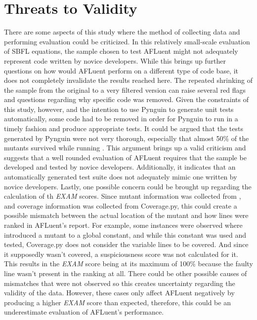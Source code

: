 \section{Threats to Validity}

There are some aspects of this study where the method of collecting data and
performing evaluation could be criticized. In this relatively small-scale
evaluation of SBFL equations, the sample chosen to test AFLuent might not
adequately represent code written by novice developers. While this brings up
further questions on how would AFLuent perform on a different type of code base, it
does not completely invalidate the results reached here. The repeated shrinking of the
sample from the original  to a very filtered version
can raise several red flags and questions regarding why specific code was
removed. Given the constraints of this study, however, and the intention to
use Pynguin to generate unit tests automatically, some code had to be removed in order
for Pynguin to run in a timely fashion and produce appropriate tests. It could
be argued that the tests generated by Pynguin were not very thorough, especially
that almost 50\% of the mutants survived while running . This
argument brings up a valid criticism and suggests that a well rounded evaluation
of AFLuent requires that the sample be developed and tested by novice developers.
Additionally, it indicates that an automatically generated
test suite does not adequately mimic one written by novice developers.
Lastly, one possible concern could be brought up regarding the calculation of th
\emph{EXAM} scores. Since mutant information was collected from ,
and coverage information was collected from Coverage.py, this could create a
possible mismatch between the actual location of the mutant and how lines were
ranked in AFLuent's report. For example, some instances were observed where
 introduced a mutant to a global constant, and while this constant
was used and tested, Coverage.py does not consider the variable lines to be
covered. And since it supposedly wasn't covered, a suspiciousness score was not
calculated for it. This results in the \emph{EXAM} score being at its maximum of
100\% because the faulty line wasn't present in the ranking at all. There could
be other possible causes of mismatches that were not observed so this creates
uncertainty regarding the validity of the data. However, these cases only affect
AFLuent negatively by producing a higher \emph{EXAM} score than expected, therefore,
this could be an underestimate evaluation of AFLuent's performance.